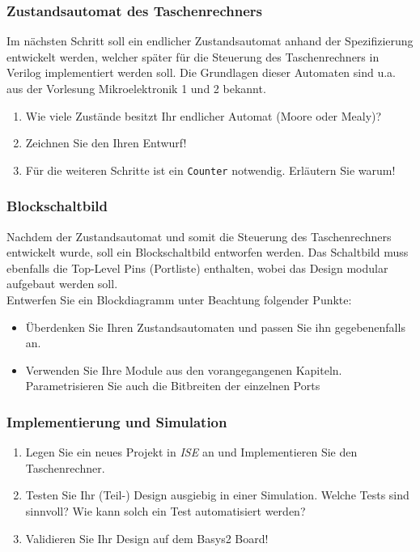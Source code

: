 \subsubsection{Zustandsautomat des Taschenrechners}
Im nächsten Schritt soll ein endlicher Zustandsautomat anhand der Spezifizierung entwickelt werden, welcher später für die Steuerung des Taschenrechners in Verilog implementiert werden soll.
Die Grundlagen dieser Automaten sind u.a. aus der Vorlesung Mikroelektronik 1 und 2 bekannt. 
\begin{enumerate}
\item Wie viele Zustände besitzt Ihr endlicher Automat (Moore oder Mealy)?
\item Zeichnen Sie den Ihren Entwurf!
\item Für die weiteren Schritte ist ein \texttt{Counter} notwendig. Erläutern Sie warum!
\end{enumerate}
\subsubsection{Blockschaltbild}
Nachdem der Zustandsautomat und somit die Steuerung des Taschenrechners entwickelt wurde, soll ein Blockschaltbild entworfen werden. Das Schaltbild muss ebenfalls die Top-Level Pins (Portliste) enthalten, wobei das Design modular aufgebaut werden soll.\\
Entwerfen Sie ein Blockdiagramm unter Beachtung folgender Punkte:
\begin{itemize}
\item Überdenken Sie Ihren Zustandsautomaten und passen Sie ihn gegebenenfalls an.
\item Verwenden Sie Ihre Module aus den vorangegangenen Kapiteln. Parametrisieren Sie auch die Bitbreiten der einzelnen Ports 
\end{itemize}
\subsubsection{Implementierung und Simulation}
\begin{enumerate}
\item Legen Sie ein neues Projekt in \emph{ISE} an und Implementieren Sie den Taschenrechner. 
\item Testen Sie Ihr (Teil-) Design ausgiebig in einer Simulation. Welche Tests sind sinnvoll? Wie kann solch ein Test automatisiert werden?
\item Validieren Sie Ihr Design auf dem Basys2 Board!
\end{enumerate}
\resumetocwriting